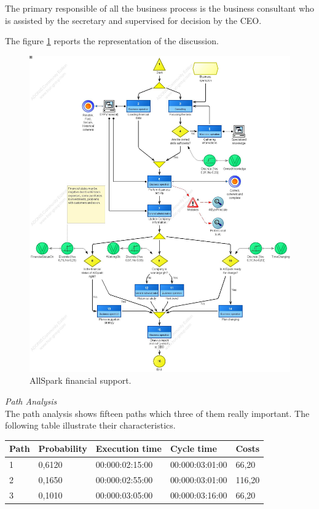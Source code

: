 The primary responsible of all the business process is the business consultant who is assisted by the secretary and supervised for decision by the CEO.

The figure \ref{2img:financial_sup} reports the representation of the discussion.\\

\begin{figure}[ht!]
\begin{centering}
\includegraphics[scale=0.35, angle=90]{assign2/adonis/imgs/financial_sup.jpg}
\caption{AllSpark financial support.}
\label{2img:financial_sup}
\end{centering}
\end{figure}

\noindent
\emph{Path Analysis}\\
The path analysis shows fifteen paths which three of them really important. The following table illustrate their characteristics.\\

\begin{table}
\centering
\begin{tabular}{|l|l|l|l|l|}
Path&Probability&Execution time&Cycle time&Costs\\
\hline
1&0,6120&00:000:02:15:00&00:000:03:01:00&66,20\\
\hline
2&0,1650&00:000:02:55:00&00:000:03:01:00&116,20\\
\hline
3&0,1010&00:000:03:05:00&00:000:03:16:00&66,20
\end{tabular}
\end{table}\\

